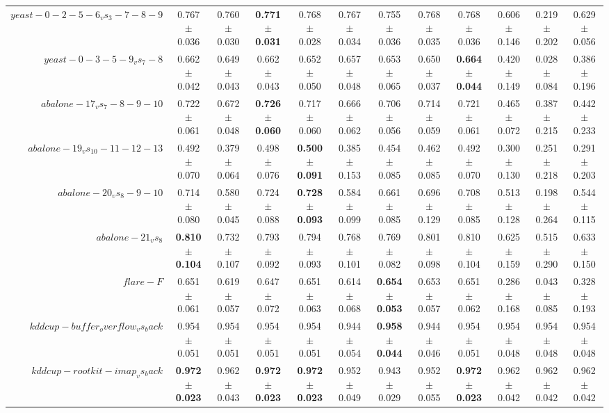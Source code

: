 \begin{table}[!ht]
{\begin{tabular}{r c c c c c c c c c c c}
$yeast-0-2-5-6_vs_3-7-8-9$ & 0.767 $\pm$ 0.036 & 0.760 $\pm$ 0.030 & \textbf{0.771 $\pm$ 0.031} & 0.768 $\pm$ 0.028 & 0.767 $\pm$ 0.034 & 0.755 $\pm$ 0.036 & 0.768 $\pm$ 0.035 & 0.768 $\pm$ 0.036 & 0.606 $\pm$ 0.146 & 0.219 $\pm$ 0.202 & 0.629 $\pm$ 0.056 \\
$yeast-0-3-5-9_vs_7-8$ & 0.662 $\pm$ 0.042 & 0.649 $\pm$ 0.043 & 0.662 $\pm$ 0.043 & 0.652 $\pm$ 0.050 & 0.657 $\pm$ 0.048 & 0.653 $\pm$ 0.065 & 0.650 $\pm$ 0.037 & \textbf{0.664 $\pm$ 0.044} & 0.420 $\pm$ 0.149 & 0.028 $\pm$ 0.084 & 0.386 $\pm$ 0.196 \\
$abalone-17_vs_7-8-9-10$ & 0.722 $\pm$ 0.061 & 0.672 $\pm$ 0.048 & \textbf{0.726 $\pm$ 0.060} & 0.717 $\pm$ 0.060 & 0.666 $\pm$ 0.062 & 0.706 $\pm$ 0.056 & 0.714 $\pm$ 0.059 & 0.721 $\pm$ 0.061 & 0.465 $\pm$ 0.072 & 0.387 $\pm$ 0.215 & 0.442 $\pm$ 0.233 \\
$abalone-19_vs_10-11-12-13$ & 0.492 $\pm$ 0.070 & 0.379 $\pm$ 0.064 & 0.498 $\pm$ 0.076 & \textbf{0.500 $\pm$ 0.091} & 0.385 $\pm$ 0.153 & 0.454 $\pm$ 0.085 & 0.462 $\pm$ 0.085 & 0.492 $\pm$ 0.070 & 0.300 $\pm$ 0.130 & 0.251 $\pm$ 0.218 & 0.291 $\pm$ 0.203 \\
$abalone-20_vs_8-9-10$ & 0.714 $\pm$ 0.080 & 0.580 $\pm$ 0.045 & 0.724 $\pm$ 0.088 & \textbf{0.728 $\pm$ 0.093} & 0.584 $\pm$ 0.099 & 0.661 $\pm$ 0.085 & 0.696 $\pm$ 0.129 & 0.708 $\pm$ 0.085 & 0.513 $\pm$ 0.128 & 0.198 $\pm$ 0.264 & 0.544 $\pm$ 0.115 \\
$abalone-21_vs_8$ & \textbf{0.810 $\pm$ 0.104} & 0.732 $\pm$ 0.107 & 0.793 $\pm$ 0.092 & 0.794 $\pm$ 0.093 & 0.768 $\pm$ 0.101 & 0.769 $\pm$ 0.082 & 0.801 $\pm$ 0.098 & 0.810 $\pm$ 0.104 & 0.625 $\pm$ 0.159 & 0.515 $\pm$ 0.290 & 0.633 $\pm$ 0.150 \\
$flare-F$ & 0.651 $\pm$ 0.061 & 0.619 $\pm$ 0.057 & 0.647 $\pm$ 0.072 & 0.651 $\pm$ 0.063 & 0.614 $\pm$ 0.068 & \textbf{0.654 $\pm$ 0.053} & 0.653 $\pm$ 0.057 & 0.651 $\pm$ 0.062 & 0.286 $\pm$ 0.168 & 0.043 $\pm$ 0.085 & 0.328 $\pm$ 0.193 \\
$kddcup-buffer_overflow_vs_back$ & 0.954 $\pm$ 0.051 & 0.954 $\pm$ 0.051 & 0.954 $\pm$ 0.051 & 0.954 $\pm$ 0.051 & 0.944 $\pm$ 0.054 & \textbf{0.958 $\pm$ 0.044} & 0.944 $\pm$ 0.046 & 0.954 $\pm$ 0.051 & 0.954 $\pm$ 0.048 & 0.954 $\pm$ 0.048 & 0.954 $\pm$ 0.048 \\
$kddcup-rootkit-imap_vs_back$ & \textbf{0.972 $\pm$ 0.023} & 0.962 $\pm$ 0.043 & \textbf{0.972 $\pm$ 0.023} & \textbf{0.972 $\pm$ 0.023} & 0.952 $\pm$ 0.049 & 0.943 $\pm$ 0.029 & 0.952 $\pm$ 0.055 & \textbf{0.972 $\pm$ 0.023} & 0.962 $\pm$ 0.042 & 0.962 $\pm$ 0.042 & 0.962 $\pm$ 0.042 \\

\end{tabular}}
\end{table}
